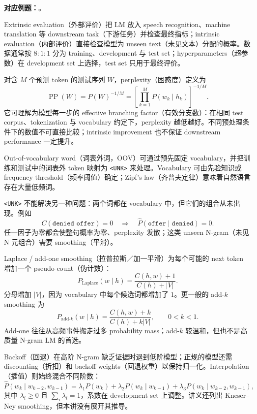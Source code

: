 \textbf{对应例题：}。


Extrinsic evaluation（外部评价）把 LM 放入 speech recognition、machine translation 等 downstream task（下游任务）并检查最终指标；intrinsic evaluation（内部评价）直接检查模型为 unseen text（未见文本）分配的概率。数据通常按 $8{:}1{:}1$ 分为 training、development 与 test set；hyperparameters（超参数）在 development set 上选择，test set 只用于最终评价。

对含 $M$ 个预测 token 的测试序列 $W$，perplexity（困惑度）定义为
\[
  \operatorname{PP}(W)=P(W)^{-1/M}
  =\left[\prod_{k=1}^{M}P(w_k\mid h_k)\right]^{-1/M}.
\]
它可理解为模型每一步的 effective branching factor（有效分支数）：在相同 test corpus、tokenization 与 vocabulary 约定下，perplexity 越低越好。不同预处理条件下的数值不可直接比较；intrinsic improvement 也不保证 downstream performance 一定提升。


Out-of-vocabulary word（词表外词，OOV）可通过预先固定 vocabulary，并把训练和测试中的词表外 token 映射为 \texttt{<UNK>} 来处理。Vocabulary 可由先验知识或 frequency threshold（频率阈值）确定；Zipf's law（齐普夫定律）意味着自然语言存在大量低频词。

\texttt{<UNK>} 不能解决另一种问题：两个词都在 vocabulary 中，但它们的组合从未出现。例如
\[
  C(\texttt{denied offer})=0
  \quad\Longrightarrow\quad
  \hat P(\texttt{offer}\mid\texttt{denied})=0.
\]
任一因子为零都会使整句概率为零、perplexity 发散；这类 unseen N-gram（未见 N 元组合）需要 smoothing（平滑）。


Laplace / add-one smoothing（拉普拉斯／加一平滑）为每个可能的 next token 增加一个 pseudo-count（伪计数）：
\[
  P_{\mathrm{Laplace}}(w\mid h)
  =\frac{C(h,w)+1}{C(h)+|V|}.
\]
分母增加 $|V|$，因为 vocabulary 中每个候选词都增加了 $1$。更一般的 add-$k$ smoothing 为
\[
  P_{\mathrm{add}\text{-}k}(w\mid h)
  =\frac{C(h,w)+k}{C(h)+k|V|},\qquad 0<k<1.
\]
Add-one 往往从高频事件搬走过多 probability mass；add-$k$ 较温和，但也不是高质量 N-gram LM 的首选。

Backoff（回退）在高阶 N-gram 缺乏证据时退到低阶模型；正规的模型还需 discounting（折扣）和 backoff weights（回退权重）以保持归一化。Interpolation（插值）则始终混合不同阶数：
\[
  \hat P(w_k\mid w_{k-2},w_{k-1})
  =\lambda_1P(w_k)
  +\lambda_2P(w_k\mid w_{k-1})
  +\lambda_3P(w_k\mid w_{k-2},w_{k-1}),
\]
其中 $\lambda_i\ge0$ 且 $\sum_i\lambda_i=1$，系数在 development set 上调整。讲义还列出 Kneser--Ney smoothing，但本讲没有展开其推导。

